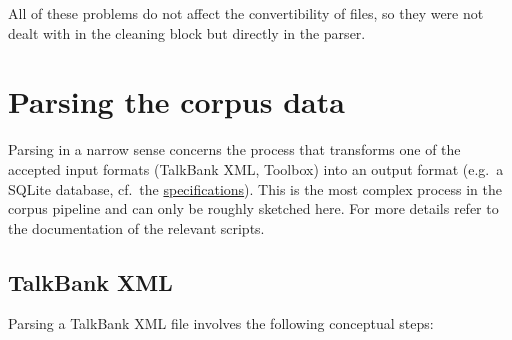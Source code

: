 \documentclass[a4paper, 11pt]{book}
\begin{document}
All of these problems do not affect the convertibility of files, so they were not dealt with in the cleaning block but directly in the parser. 


\section{Parsing the corpus data}
\label{sec:Parsing the corpus data}

Parsing in a narrow sense concerns the process that transforms one of the accepted input formats (TalkBank XML, Toolbox) into an output format (e.g.\ a SQLite database, cf.\ the \hyperref[sec:Structure of the corpus]{specifications}). This is the most complex process in the corpus pipeline and can only be roughly sketched here. For more details refer to the documentation of the relevant scripts. 

\subsection{TalkBank XML}

Parsing a TalkBank XML file involves the following conceptual steps: 
\end{document}
